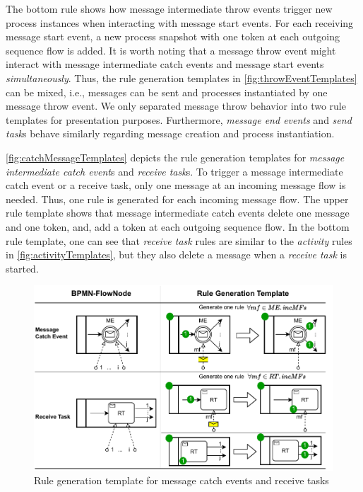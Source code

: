 \documentclass[submission, copyright, creativecommons]{eptcs}
\begin{document}
The bottom rule shows how message intermediate throw events trigger new process instances when interacting with message start events.
For each receiving message start event, a new process snapshot with one token at each outgoing sequence flow is added.
It is worth noting that a message throw event might interact with message intermediate catch events and message start events \textit{simultaneously}.
Thus, the rule generation templates in \autoref{fig:throwEventTemplates} can be mixed, i.e., messages can be sent and processes instantiated by one message throw event.
We only separated message throw behavior into two rule templates for presentation purposes.
Furthermore, \textit{message end events} and \textit{send task}s behave similarly regarding message creation and process instantiation.

\autoref{fig:catchMessageTemplates} depicts the rule generation templates for \textit{message intermediate catch event}s and \textit{receive task}s.
To trigger a message intermediate catch event or a receive task, only one message at an incoming message flow is needed.
Thus, one rule is generated for each incoming message flow.
The upper rule template shows that message intermediate catch events delete one message and one token, and, add a token at each outgoing sequence flow.
In the bottom rule template, one can see that \textit{receive task} rules are similar to the \textit{activity} rules in \autoref{fig:activityTemplates}, but they also delete a message when a \textit{receive task} is started.

\begin{figure}[h]
    \centering
    \includegraphics[width=1\textwidth]{images/catch_messages.pdf}
    \caption{Rule generation template for message catch events and receive tasks}
    \label{fig:catchMessageTemplates}
\end{figure}
\end{document}
